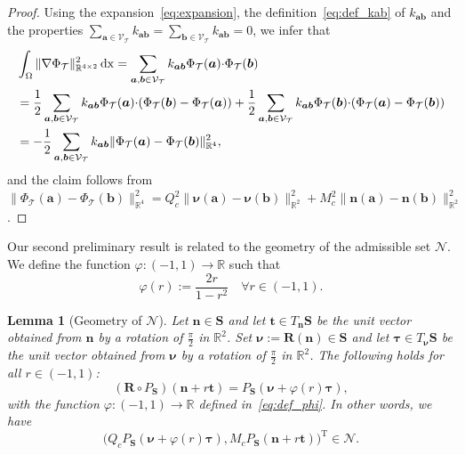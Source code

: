 \documentclass[a4paper,11pt]{article}
\newtheorem{lemma}[theorem]{Lemma}
\theoremstyle{definition}
\theoremstyle{remark}
\numberwithin{equation}{section}
\newcommand{\dx}{\,{\rm dx}}
\newcommand{\Real}{\mathbb{R}}
\newcommand{\ba}{{\boldsymbol a}}
\newcommand{\bb}{{\boldsymbol b}}
\newcommand{\bn}{{\boldsymbol n}}
\newcommand{\bt}{{\boldsymbol t}}
\newcommand{\bR}{{\boldsymbol R}}
\newcommand{\bS}{{\boldsymbol S}}
\newcommand{\bnu}{{\boldsymbol \nu}}
\newcommand{\btau}{{\boldsymbol \tau}}
\newcommand{\calN}{\mathcal{N}}
\newcommand{\calT}{\mathcal{T}}
\newcommand{\calV}{\mathcal{V}}
\newcommand{\tr}{^{\mathrm{T}}}
\newcommand{\SCAL}{{\cdot}}
\newcommand{\vertex}{\calV_\calT}
\begin{document}
\begin{proof}
Using the expansion~\eqref{eq:expansion}, the definition~\eqref{eq:def_kab} of $k_{\ba\bb}$ and the properties $\sum_{\ba\in \vertex} k_{\ba\bb}= \sum_{\bb\in \vertex} k_{\ba\bb} = 0$,
we infer that
\begin{align*}
&\int_\Omega \|\nabla \Phi_\calT\|_{\Real^{4\times2}}^2 \dx = \sum_{\ba,\bb\in\vertex}
k_{\ba\bb} \Phi_\calT(\ba) \SCAL \Phi_\calT(\bb) \\
&=\frac12 \sum_{\ba,\bb\in\vertex}
k_{\ba\bb} \Phi_\calT(\ba) \SCAL (\Phi_\calT(\bb)-\Phi_\calT(\ba)) + 
\frac12 \sum_{\ba,\bb\in\vertex}
k_{\ba\bb} \Phi_\calT(\bb) \SCAL (\Phi_\calT(\ba)-\Phi_\calT(\bb))  \\
&=-\frac12 \sum_{\ba,\bb\in\vertex}
k_{\ba\bb} \|\Phi_\calT(\ba)-\Phi_\calT(\bb)\|_{\Real^4}^2,
\end{align*}
and the claim follows from 
$\|\Phi_\calT(\ba)-\Phi_\calT(\bb)\|_{\Real^4}^2 = Q_c^2\|\bnu(\ba)-\bnu(\bb)\|_{\Real^2}^2 + M_c^2\|\bn(\ba)-\bn(\bb)\|_{\Real^2}^2$.
\end{proof}

Our second preliminary result is related to the geometry of the admissible set $\calN$.
We define the function $\varphi:(-1,1)\rightarrow\Real$ such that
\begin{equation} \label{eq:def_phi}
\varphi(r) := \frac{2r}{1-r^2} \quad \forall r\in(-1,1).
\end{equation}

\begin{lemma}[Geometry of $\calN$] \label{lem:phi}
Let $\bn\in\bS$ and let $\bt\in T_{\bn}\bS$ be the unit vector 
obtained from $\bn$ by a rotation
of $\frac{\pi}{2}$ in $\Real^2$. Set $\bnu:=\bR(\bn)\in\bS$ and let 
$\btau\in T_{\bnu}\bS$ be the unit vector obtained from $\bnu$ by a rotation
of $\frac{\pi}{2}$ in $\Real^2$. The following holds for all $r\in (-1,1)$:
\begin{equation} \label{eq:RPS}
(\bR \circ P_{\bS})(\bn + r \bt) = P_{\bS}(\bnu + \varphi(r)\btau),
\end{equation}
with the function $\varphi:(-1,1)\rightarrow\Real$ defined in~\eqref{eq:def_phi}. 
In other words, we have
\begin{equation} \label{eq:RPinN}
\big(Q_c P_{\bS}(\bnu + \varphi(r)\btau),M_cP_{\bS}(\bn + r \bt)\big)\tr \in \calN.
\end{equation}
\end{lemma}
\end{document}
